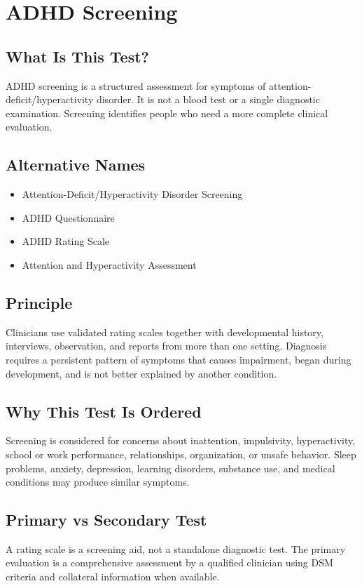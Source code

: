 \chapter{ADHD Screening}

\section*{What Is This Test?}
ADHD screening is a structured assessment for symptoms of attention-deficit/hyperactivity disorder. It is not a blood test or a single diagnostic examination. Screening identifies people who need a more complete clinical evaluation.

\section*{Alternative Names}
\begin{itemize}
  \item Attention-Deficit/Hyperactivity Disorder Screening
  \item ADHD Questionnaire
  \item ADHD Rating Scale
  \item Attention and Hyperactivity Assessment
\end{itemize}

\section*{Principle}
Clinicians use validated rating scales together with developmental history, interviews, observation, and reports from more than one setting. Diagnosis requires a persistent pattern of symptoms that causes impairment, began during development, and is not better explained by another condition.

\section*{Why This Test Is Ordered}
Screening is considered for concerns about inattention, impulsivity, hyperactivity, school or work performance, relationships, organization, or unsafe behavior. Sleep problems, anxiety, depression, learning disorders, substance use, and medical conditions may produce similar symptoms.

\section*{Primary vs Secondary Test}
A rating scale is a screening aid, not a standalone diagnostic test. The primary evaluation is a comprehensive assessment by a qualified clinician using DSM criteria and collateral information when available.

